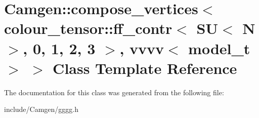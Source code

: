 \hypertarget{a00101}{\section{Camgen\-:\-:compose\-\_\-vertices$<$ colour\-\_\-tensor\-:\-:ff\-\_\-contr$<$ S\-U$<$ N $>$, 0, 1, 2, 3 $>$, vvvv$<$ model\-\_\-t $>$ $>$ Class Template Reference}
\label{a00101}
}


The documentation for this class was generated from the following file\-:\begin{DoxyCompactItemize}
\item 
include/\-Camgen/gggg.\-h\end{DoxyCompactItemize}
